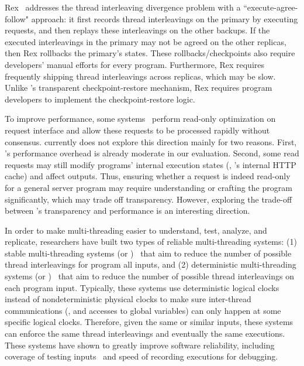 Rex~\cite{rex:eurosys14} addresses the thread interleaving divergence problem 
with a ``execute-agree-follow" approach: it first records thread interleavings 
on the primary by executing requests, and then replays these interleavings 
on the other backups. If the executed interleavings in the primary may not be 
agreed on the other replicas, then Rex rollbacks the primary's states. These 
rollbacks/checkpoints also require developers' manual efforts for every 
program. Furthermore, Rex requires frequently shipping thread interleavings 
across replicas, which may be slow. Unlike \xxx's transparent 
checkpoint-restore mechanism, Rex requires program developers to implement 
the checkpoint-restore logic.

To improve performance, some \smr systems~\cite{eve:osdi12, pbft:osdi99, 
upright:sosp09, zyzzyva:sosp07, zookeeper} perform read-only optimization 
on request interface and allow these requests to be processed rapidly without 
consensus. \xxx currently does not explore this direction mainly for two 
reasons. First, \xxx's performance overhead is already moderate in our 
evaluation. Second, some read requests may still modify programs' internal 
execution states (\eg, \apache's internal HTTP cache) and affect outputs. Thus,
ensuring whether a request is indeed read-only for a general server program may 
require understanding or crafting the program significantly, which may trade 
off transparency. However, exploring the trade-off between \xxx's transparency 
and performance is an interesting direction.

  In order to make multi-threading easier to 
understand, test, analyze, and replicate, researchers have built two types of 
reliable multi-threading systems: (1) stable multi-threading systems (or 
\smt)~\cite{grace:oopsla09, dthreads:sosp11, determinator:osdi10} that aim to 
reduce the number of possible thread interleavings for program all inputs, and 
(2) deterministic multi-threading systems (or \dmt)~\cite{dpj:oopsla09, 
dmp:asplos09,kendo:asplos09,coredet:asplos10,dos:osdi10,ddos:asplos13,
ics:oopsla13} that aim to reduce the number of possible thread interleavings on 
each program input. Typically, these systems use deterministic logical clocks 
instead of nondeterministic physical clocks to make sure inter-thread 
communications (\eg, \mutexlock and accesses to global variables) can only 
happen at some specific logical clocks. Therefore, given the same or similar 
inputs, these systems can enforce the same thread interleavings and eventually 
the same executions. These systems 
have shown to greatly improve software reliability, including coverage of 
testing inputs~\cite{ics:oopsla13} and speed of recording 
executions\cite{dos:osdi10} for debugging.

